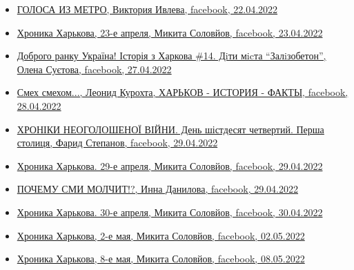 \begin{itemize}
\item \hyperlink{22_04_2022.fb.ivleva_viktoria.moskva.ng.1.golosa_iz_metro}{%
ГОЛОСА ИЗ МЕТРО, Виктория Ивлева, facebook, 22.04.2022%
}

\item \hyperlink{23_04_2022.fb.solovjov_mikita.harkov.demsokyra.1.hronika}{%
Хроника Харькова, 23-е апреля, Микита Соловйов, facebook, 23.04.2022%
}

\item \hyperlink{27_04_2022.fb.suetova_olena.kiev.1.istoria_v_harkova_14}{%
Доброго ранку Україна! Історія з Харкова \#14. Дiти мicта \enquote{Залiзобетон}, %
Олена Суєтова, facebook, 27.04.2022%
}

\item \hyperlink{28_04_2022.fb.fb_group.harkov_istoria_fakty.1.smeh_smehom}{%
Смех смехом..., Леонид Курохта, ХАРЬКОВ - ИСТОРИЯ - ФАКТЫ, facebook, 28.04.2022%
}

\item \hyperlink{29_04_2022.fb.fb_group.story_kiev_ua.1.hronika_harkov}{%
ХРОНІКИ НЕОГОЛОШЕНОЇ ВІЙНИ. День шістдесят четвертий. Перша столиця, Фарид Степанов, facebook, 29.04.2022%
}

\item \hyperlink{29_04_2022.fb.solovjov_mikita.harkov.demsokyra.1.hronika}{%
Хроника Харькова. 29-е апреля, Микита Соловйов, facebook, 29.04.2022%
}

\item \hyperlink{29_04_2022.fb.danilova_inna.harkov.1.smi_molchit}{%
ПОЧЕМУ СМИ МОЛЧИТ!?, Инна Данилова, facebook, 29.04.2022%
}

\item \hyperlink{30_04_2022.fb.solovjov_mikita.harkov.demsokyra.1.hronika}{%
Хроника Харькова. 30-е апреля, Микита Соловйов, facebook, 30.04.2022%
}

\item \hyperlink{02_05_2022.fb.solovjov_mikita.harkov.demsokyra.1.hronika}{%
Хроника Харькова, 2-е мая, Микита Соловйов, facebook, 02.05.2022%
}


\item \hyperlink{08_05_2022.fb.solovjov_mikita.harkov.demsokyra.1.hronika}{%
Хроника Харькова, 8-е мая, Микита Соловйов, facebook, 08.05.2022%
}

\end{itemize} %

